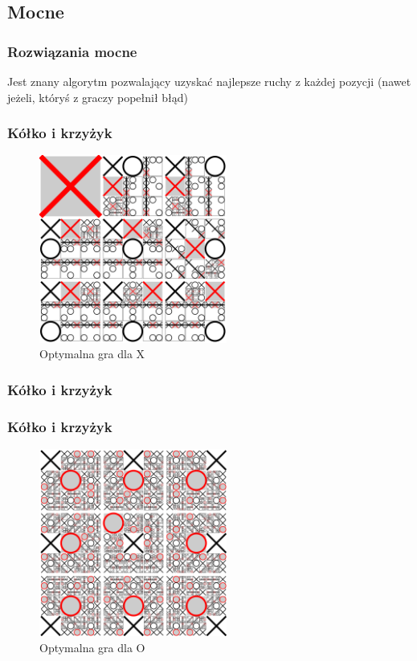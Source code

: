\documentclass[polish,envcountsect,10pt]{beamer}
\begin{document}
        \subsection{Mocne}
            \begin{frame}
                \frametitle{Rozwiązania mocne}
                Jest znany algorytm pozwalający uzyskać najlepsze ruchy z każdej pozycji (nawet jeżeli, któryś z graczy popełnił błąd)
            \end{frame}
            \begin{frame}
                \frametitle{Kółko i krzyżyk}
                \begin{figure}[H]
                    \centering
                    \includegraphics[width=0.55\textwidth,natwidth=480,natheight=480]{images/480px-Tictactoe-X.svg.png}
                    \caption{Optymalna gra dla X}
                \end{figure}
            \end{frame}
        \subsubsection{Kółko i krzyżyk}
            \begin{frame}
                \frametitle{Kółko i krzyżyk}
                \begin{figure}[H]
                    \centering
                    \includegraphics[width=0.55\textwidth,natwidth=480,natheight=480]{images/480px-Tictactoe-O.svg.png}
                    \caption{Optymalna gra dla O}
                \end{figure}
            \end{frame}
\end{document}
